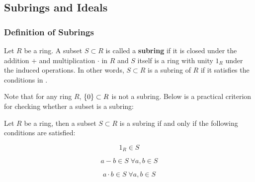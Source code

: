 \documentclass[a4paper,12pt]{article}
\begin{document}
\subsection{Subrings and Ideals}
\subsubsection{Definition of Subrings}
\begin{dft}
  Let $R$ be a ring. A subset $S\subset R$ is called a \textbf{subring} if it is closed under the addition $+$ and multiplication $\cdot$ in $R$ and $S$ itself is a ring with unity $1_{R}$ under the induced operations. In other words, $S\subset R$ is a subring of $R$ if it satisfies the conditions in \rdft[\sctr{32}].
\end{dft}\n

Note that for any ring $R$, $\left\{ 0\right\}\subset R$ is not a subring. Below is a practical criterion for checking whether a subset is a subring:\n

\begin{pst}
  Let $R$ be a ring, then a subset $S\subset R$ is a subring if and only if the following conditions are satisfied:

  \begin{alist}
    \item

    $$1_{R}\in S$$

    \item

    $$a-b\in S\;\forall a,b\in S$$

    \item

    $$a\cdot b\in S\;\forall a,b\in S$$
  \end{alist}
\end{pst}\n
\end{document}
